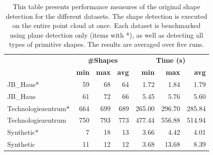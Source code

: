 \begin{table}
	\centering
	\begin{tabular}{ l || r | r | r || r | r | r}
						&\multicolumn{3}{c||}{\textbf{\#Shapes}} & \multicolumn{3}{c}{\textbf{Time (s)}}\\
						&\textbf{min} & \textbf{max} & \textbf{avg}  & \textbf{min} & \textbf{max} & \textbf{avg}  \\
						\hline
            JB\_Haus*          &  59 &  68 &	64 &   1.72 &   1.84 &   1.79 \\
            JB\_Haus           &  61 &  72 &  66 &   5.45 &   5.76 &   5.60 \\
            Technologiezentrum*& 664 & 699 & 689 & 265.00 & 296.70 & 285.84 \\
            Technologiezentrum & 750 & 793 & 773 & 477.44 & 556.88 & 514.94	\\
            Synthetic*         &   7 &  18 &  13 &   3.66 &   4.42 &   4.01 \\
            Synthetic          &  11 &  12 &	12 &   3.68 &  13.68 &   8.39 \\
	\end{tabular}
\caption[Original shape detection performance measures for different datasets]{This table presents performance measures of the original shape detection for the different datasets. The shape detection is executed on the entire point cloud at once. Each dataset is benchmarked using plane detection only (items with *), as well as detecting all types of primitive shapes. The results are averaged over five runs. } 
\label{tab:schnabel_benchmarks2}
\end{table}

